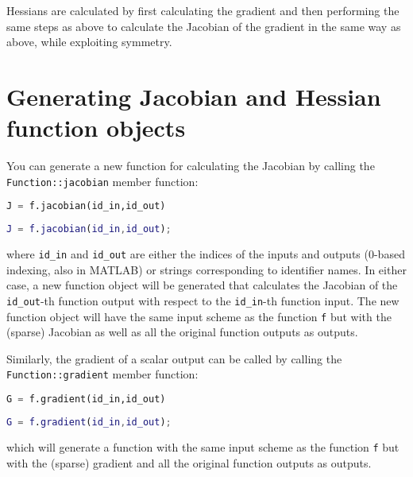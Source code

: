 \documentclass[a4paper,12pt]{book}
\begin{document}
Hessians are calculated by first calculating the gradient and then performing the same steps as above to calculate the Jacobian of the gradient in the same way as above, while exploiting symmetry.

\section{Generating Jacobian and Hessian function objects}
You can generate a new function for calculating the Jacobian by calling the \texttt{Function::jacobian} member function:

\begin{minipage}[t]{0.5\textwidth}
\begin{lstlisting}[language=Python]
J = f.jacobian(id_in,id_out)
\end{lstlisting}
\end{minipage}
\begin{minipage}[t]{0.5\textwidth}
\begin{lstlisting}[language=Matlab]
J = f.jacobian(id_in,id_out);
\end{lstlisting}
\end{minipage}

where \texttt{id\_in} and \texttt{id\_out} are either the indices of the inputs and outputs (0-based indexing, also in MATLAB) or strings corresponding to identifier names. In either case, a new function object will be generated that calculates the Jacobian of the \texttt{id\_out}-th function output with respect to the \texttt{id\_in}-th function input. The new function object will have the same input scheme as the function \texttt{f} but with the (sparse) Jacobian as well as all the original function outputs as outputs.

Similarly, the gradient of a scalar output can be called by calling the \texttt{Function::gradient} member function:

\begin{minipage}[t]{0.5\textwidth}
\begin{lstlisting}[language=Python]
G = f.gradient(id_in,id_out)
\end{lstlisting}
\end{minipage}
\begin{minipage}[t]{0.5\textwidth}
\begin{lstlisting}[language=Matlab]
G = f.gradient(id_in,id_out);
\end{lstlisting}
\end{minipage}

which will generate a function with the same input scheme as the function \texttt{f} but with the (sparse) gradient and all the original function outputs as outputs.
\end{document}
